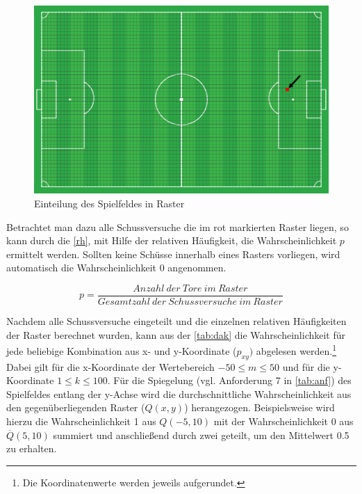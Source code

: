 \begin{figure}[H]
\centering
\includegraphics[scale=0.28]{se-wa-jpg/raster}
\caption[Einteilung des Spielfeldes in Raster]{Einteilung des Spielfeldes in Raster}
\label{raster}
\end{figure}

Betrachtet man dazu alle Schussversuche die im rot markierten Raster liegen, so kann durch die \vref{rh}, mit Hilfe der relativen Häufigkeit, die Wahrscheinlichkeit $p$ ermittelt werden. Sollten keine Schüsse innerhalb eines Rasters vorliegen, wird automatisch die Wahrscheinlichkeit 0 angenommen.

\begin{equation}
p = \frac{Anzahl~der~Tore~im~Raster}{Gesamtzahl~der~Schussversuche~im~Raster}
\label{rh}
\end{equation}

Nachdem alle Schussversuche eingeteilt und die einzelnen relativen Häufigkeiten der Raster berechnet wurden, kann aus der \vref{tab:dak} die Wahrscheinlichkeit für jede beliebige Kombination aus x- und y-Koordinate ($p_{xy})$ abgelesen werden.\footnote{Die Koordinatenwerte werden jeweils aufgerundet.} Dabei gilt für die x-Koordinate der Wertebereich $-50 \le m \le 50$ und für die y-Koordinate $1 \le k \le 100$. Für die Spiegelung (vgl. Anforderung 7 in \vref{tab:anf}) des Spielfeldes entlang der y-Achse wird die durchschnittliche Wahrscheinlichkeit aus den gegenüberliegenden Raster ($Q(x,y)$) herangezogen. Beispielsweise wird hierzu die Wahrscheinlichkeit \textsf{1} aus $Q(-5,10)$ mit der Wahrscheinlichkeit \textsf{0} aus $\overline{Q}(5,10)$ summiert und anschließend durch zwei geteilt, um den Mittelwert \textsf{0.5} zu erhalten. 



